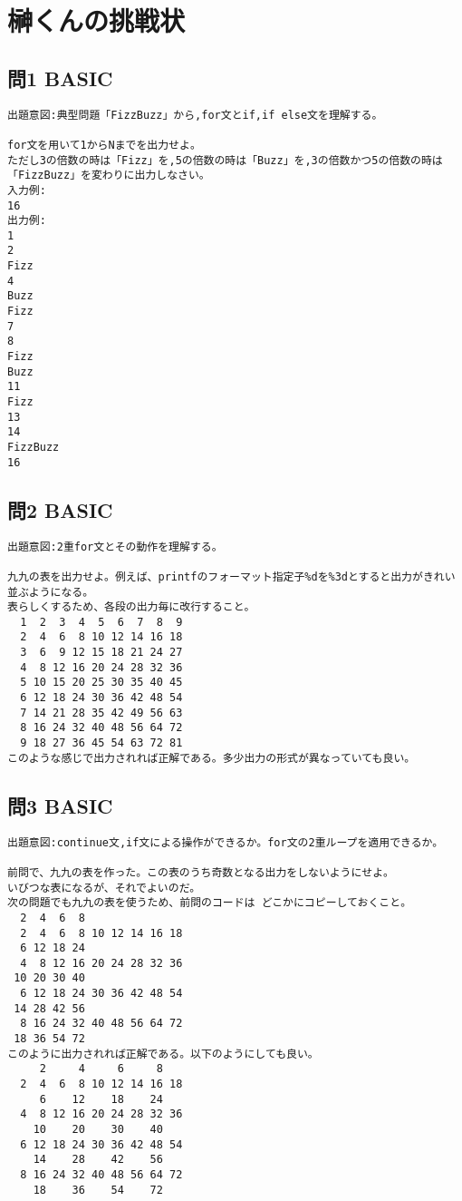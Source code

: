 \documentclass[a4j,titlepage,dvipdfmx]{jsarticle}   %
\begin{document}
\section{榊くんの挑戦状}

\subsection{問1 BASIC}
\begin{verbatim}
出題意図:典型問題「FizzBuzz」から,for文とif,if else文を理解する。

for文を用いて1からNまでを出力せよ。
ただし3の倍数の時は「Fizz」を,5の倍数の時は「Buzz」を,3の倍数かつ5の倍数の時は「FizzBuzz」を変わりに出力しなさい。
入力例:
16
出力例:
1
2
Fizz
4
Buzz
Fizz
7
8
Fizz
Buzz
11
Fizz
13
14
FizzBuzz
16
\end{verbatim}

\subsection{問2 BASIC}
\begin{verbatim}
出題意図:2重for文とその動作を理解する。

九九の表を出力せよ。例えば、printfのフォーマット指定子%dを%3dとすると出力がきれい並ぶようになる。
表らしくするため、各段の出力毎に改行すること。
  1  2  3  4  5  6  7  8  9
  2  4  6  8 10 12 14 16 18
  3  6  9 12 15 18 21 24 27
  4  8 12 16 20 24 28 32 36
  5 10 15 20 25 30 35 40 45
  6 12 18 24 30 36 42 48 54
  7 14 21 28 35 42 49 56 63
  8 16 24 32 40 48 56 64 72
  9 18 27 36 45 54 63 72 81
このような感じで出力されれば正解である。多少出力の形式が異なっていても良い。
\end{verbatim}

\subsection{問3 BASIC}
\begin{verbatim}
出題意図:continue文,if文による操作ができるか。for文の2重ループを適用できるか。

前問で、九九の表を作った。この表のうち奇数となる出力をしないようにせよ。
いびつな表になるが、それでよいのだ。
次の問題でも九九の表を使うため、前問のコードは	どこかにコピーしておくこと。
  2  4  6  8
  2  4  6  8 10 12 14 16 18
  6 12 18 24
  4  8 12 16 20 24 28 32 36
 10 20 30 40
  6 12 18 24 30 36 42 48 54
 14 28 42 56
  8 16 24 32 40 48 56 64 72
 18 36 54 72
このように出力されれば正解である。以下のようにしても良い。
     2     4     6     8
  2  4  6  8 10 12 14 16 18
     6    12    18    24
  4  8 12 16 20 24 28 32 36
    10    20    30    40
  6 12 18 24 30 36 42 48 54
    14    28    42    56
  8 16 24 32 40 48 56 64 72
    18    36    54    72
\end{verbatim}
\end{document}
